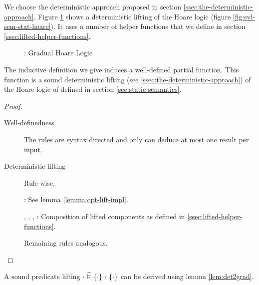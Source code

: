 We choose the deterministic approach proposed in section \ref{ssec:the-deterministic-approach}.
Figure \ref{fig:gvl-sem-stat-hoare} shows a deterministic lifting of the Hoare logic (figure \ref{fig:svl-sem-stat-hoare}).
It uses a number of helper functions that we define in section \ref{ssec:lifted-helper-functions}.
\begin{figure}[h!]
    
    \caption{\gvl: Gradual Hoare Logic} 
    \label{fig:gvl-sem-stat-hoare}
\end{figure}

\begin{lemma}
    The inductive definition we give induces a well-defined partial function.
    This function is a sound deterministic lifting (see \ref{ssec:the-deterministic-approach}) of the Hoare logic of \svlidf defined in section \ref{sec:static-semantics}.
\end{lemma}
\begin{proof}~
    \begin{description}
        \item[Well-definedness] The rules are syntax directed and only can deduce at most one result per input.
        \item[Deterministic lifting] Rule-wise.
        
        :
        See lemma \ref{lemma:opt-lift-impl}.
        
        , , , :
        Composition of lifted components as defined in \ref{ssec:lifted-helper-functions}.
        
        Remaining rules analogous.
    \end{description}
\end{proof}

A sound predicate lifting ${\cdot} \,\,\widetilde{\vDash}\,\, \{{\cdot}\} ~{\cdot}~ \{{\cdot}\}$ can be derived using lemma \ref{lem:det2grad}.